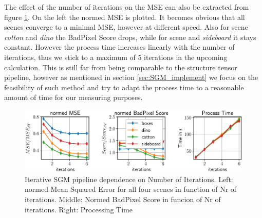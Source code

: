 \documentclass  [
  paper    = a4,
  BCOR     = 10mm,
  twoside,
  fontsize = 12pt,
  fleqn,
  toc      = bibnumbered,
  toc      = listofnumbered,
  numbers  = noendperiod,
  headings = normal,
  listof   = leveldown,
  version  = 3.03
]                                       {scrreprt}
\begin{document}
The effect of the number of iterations on the MSE can also be extracted from figure \ref{fig:chooselowersgmpprmergeiterations}. On the left the normed MSE is plotted. It becomes obvious that all scenes converge to a minimal MSE, however at different speed. Also for scene \textit{cotton} and \textit{dino} the BadPixel Score drops, while for scene  and \textit{sideboard} it stays constant. However the process time increases linearly with the number of iterations, thus we stick to a maximum of 5 iterations in the upcoming calculation. This is still far from being comparable to the structure tensor pipeline, however as mentioned in section \ref{sec:SGM_implement} we focus on the feasibility of such method and try to adapt the process time to a reasonable amount of time for our measuring purposes.
\begin{figure}
	\centering
	\includegraphics[width=1\linewidth]{images/choose_lower_sgm_ppr_merge_iterations}
	\caption[Iterative SGM dependence on Number of Iterations]{Iterative SGM pipeline dependence on Number of Iterations. Left: normed Mean Squared Error for all four scenes in function  of Nr of iterations. Middle: Normed BadPixel Score in funcion of Nr of iterations. Right: Processing Time}
	\label{fig:chooselowersgmpprmergeiterations}
\end{figure}
\end{document}
